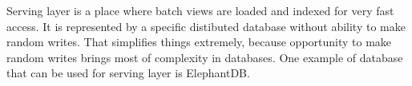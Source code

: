 
Serving layer is a place where batch views are loaded and indexed for very fast
access. It is represented by a specific distibuted database without ability to
make random writes. That simplifies things extremely, because opportunity
to make random writes brings most of complexity in databases. One example of
database that can be used for serving layer is ElephantDB.


